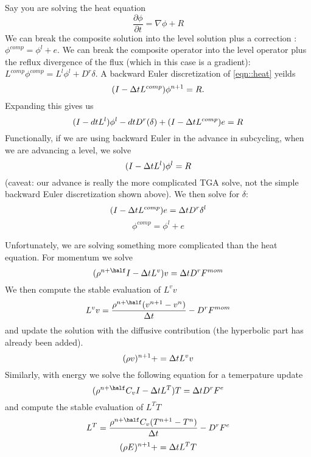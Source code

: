 Say you are solving the heat equation
\begin{equation}
\frac{\partial \phi}{\partial t} = \nabla \phi + R
\label{eqn::heat}
\end{equation}
We can break the composite solution into the level solution plus a
correction :$\phi^{comp} = \phi^l + e$.
We can break the composite operator into the level operator plus the
reflux divergence of the flux (which in this case is a gradient):
$ L^{comp} \phi^{comp} = L^l \phi^l + D^r \delta$.   
A backward Euler discretization of  \ref{eqn::heat} yeilds
$$
(I - {\Delta t} L^{comp}) \phi^{n+1} = R.
$$
Expanding this gives us
$$
(I - dt L^l)\phi^l - dt D^r (\delta) + (I - {\Delta t} L^{comp}) e = R
$$
Functionally, if we are using backward Euler in the advance in
subcycling,  when we are advancing a level, we solve
$$
(I - {\Delta t} L^l) \phi^l = R
$$
(caveat: our advance is really the more complicated
TGA solve, not the simple backward Euler discretization shown above).
We then solve for $\delta$:
$$
(I - {\Delta t} L^{comp}) e = {\Delta t} D^r \delta^l
$$
$$
\phi^{comp} = \phi^l + e
$$

Unfortunately, we are solving something more complicated than the heat
equation.    For momentum we solve
$$
(\rho^{n+\half} I - \dt L^{v}) v = \dt D^r F^{mom}
$$
We then compute the stable evaluation of $L^v v$
$$
L^v v = \frac{\rho^{n+\half}(v^{n+1}-v^n)}{\dt} - D^r F^{mom}
$$
and update the solution  with the diffusive contribution (the
hyperbolic part has already been added).
$$
(\rho v)^{n+1} += {\Delta t} L^v v
$$
Similarly, with energy we solve the following equation for a
temerpature update 
$$
(\rho^{n+\half} C_v I - \dt L^{T}) T = \dt D^r F^e
$$
and compute the stable evaluation of $L^T T$
$$
L^T = \frac{\rho^{n+\half} C_v(T^{n+1}-T^n)}{\dt} - D^r F^e
$$
$$
(\rho E)^{n+1} += {\Delta t} L^T T
$$
